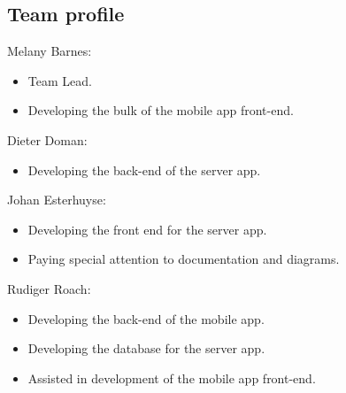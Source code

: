 \documentclass[10pt,a4paper]{article}
\begin{document}
\subsection{Team profile}
Melany Barnes:
\begin{itemize}
\item Team Lead.
\item Developing the bulk of the mobile app front-end.
\end{itemize}
Dieter Doman:
\begin{itemize}
\item Developing the back-end of the server app.
\end{itemize}
Johan Esterhuyse:
\begin{itemize}
\item Developing the front end for the server app.
\item Paying special attention to documentation and diagrams.
\end{itemize}
Rudiger Roach:
\begin{itemize}
\item Developing the back-end of the mobile app.
\item Developing the database for the server app.
\item Assisted in development of the mobile app front-end.
\end{itemize}
\end{document}
